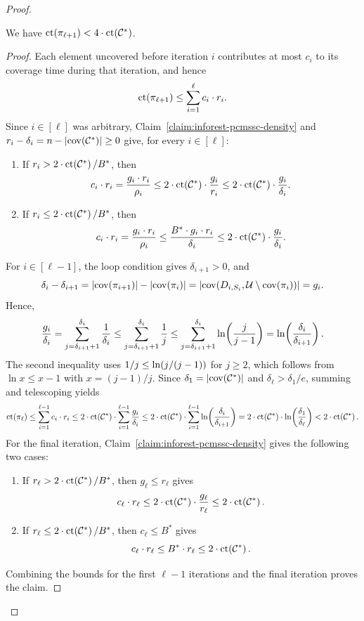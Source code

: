 \begin{proof}
\begin{claim}\label{claim:inforest-pcmssc-cost}
We have $\operatorname{ct}\mathopen{}\left( \pi_{\ell+1} \right)<4\cdot\operatorname{ct}\mathopen{}\left( \mathcal{C}^{*} \right)$.
\end{claim}
\begin{proof}
Each element uncovered before iteration $i$ contributes at most $c_i$ to its coverage time during that iteration, and hence
\[
    \operatorname{ct}\mathopen{}\left( \pi_{\ell+1} \right)\leq\sum_{i=1}^{\ell} c_i\cdot r_i.
\]
Since $i\in[\ell]$ was arbitrary, Claim~\ref{claim:inforest-pcmssc-density} and $r_i-\delta_i=n-\mathopen{}\left| \operatorname{cov}\mathopen{}\left( \mathcal{C}^{*} \right) \right|\geq0$ give, for every $i\in[\ell]$:
\begin{enumerate}
    \item If $r_i>2\cdot\operatorname{ct}\mathopen{}\left( \mathcal{C}^{*} \right)/B^*$, then
    \[
        c_i\cdot r_i=\frac{g_i\cdot r_i}{\rho_i}\leq2\cdot\operatorname{ct}\mathopen{}\left( \mathcal{C}^{*} \right)\cdot\frac{g_i}{r_i}\leq2\cdot\operatorname{ct}\mathopen{}\left( \mathcal{C}^{*} \right)\cdot\frac{g_i}{\delta_i}.
    \]
    \item If $r_i\leq2\cdot\operatorname{ct}\mathopen{}\left( \mathcal{C}^{*} \right)/B^*$, then
    \[
        c_i\cdot r_i=\frac{g_i\cdot r_i}{\rho_i}\leq\frac{B^*\cdot g_i\cdot r_i}{\delta_i}\leq2\cdot\operatorname{ct}\mathopen{}\left( \mathcal{C}^{*} \right)\cdot\frac{g_i}{\delta_i}.
    \]
\end{enumerate}
For $i\in[\ell-1]$, the loop condition gives $\delta_{i+1}>0$, and
\[
    \delta_i-\delta_{i+1}=\mathopen{}\left| \operatorname{cov}\mathopen{}\left( \pi_{i+1} \right) \right|-\mathopen{}\left| \operatorname{cov}\mathopen{}\left( \pi_i \right) \right|
    =\mathopen{}\left| \operatorname{cov}\mathopen{}\left( D_{i,S_i},\mathcal{U}\setminus\operatorname{cov}\mathopen{}\left( \pi_i \right) \right) \right|=g_i.
\]
Hence,
\[
    \frac{g_i}{\delta_i}=\sum_{j=\delta_{i+1}+1}^{\delta_i}\frac{1}{\delta_i}
    \leq\sum_{j=\delta_{i+1}+1}^{\delta_i}\frac{1}{j}
    \leq\sum_{j=\delta_{i+1}+1}^{\delta_i}\ln\mathopen{}\left( \frac{j}{j-1} \right)
    =\ln\mathopen{}\left( \frac{\delta_i}{\delta_{i+1}} \right).
\]
The second inequality uses $1/j\leq\ln\mathopen{}\left( j/(j-1) \right)$ for $j\geq2$, which follows from $\ln x\leq x-1$ with $x=(j-1)/j$.
Since $\delta_1=\mathopen{}\left| \operatorname{cov}\mathopen{}\left( \mathcal{C}^{*} \right) \right|$ and $\delta_{\ell}>\delta_1/e$, summing and telescoping yields
\[
    \operatorname{ct}\mathopen{}\left( \pi_{\ell} \right)\leq\sum_{i=1}^{\ell-1}c_i\cdot r_i\leq2\cdot\operatorname{ct}\mathopen{}\left( \mathcal{C}^{*} \right)\cdot\sum_{i=1}^{\ell-1}\frac{g_i}{\delta_i}
    \leq2\cdot\operatorname{ct}\mathopen{}\left( \mathcal{C}^{*} \right)\cdot\sum_{i=1}^{\ell-1}\ln\mathopen{}\left( \frac{\delta_i}{\delta_{i+1}} \right)
    =2\cdot\operatorname{ct}\mathopen{}\left( \mathcal{C}^{*} \right)\cdot\ln\mathopen{}\left( \frac{\delta_1}{\delta_{\ell}} \right)<2\cdot\operatorname{ct}\mathopen{}\left( \mathcal{C}^{*} \right).
\]
For the final iteration, Claim~\ref{claim:inforest-pcmssc-density} gives the following two cases:
\begin{enumerate}
    \item If $r_{\ell}>2\cdot\operatorname{ct}\mathopen{}\left( \mathcal{C}^{*} \right)/B^*$, then $g_{\ell}\leq r_{\ell}$ gives
    \[
        c_{\ell}\cdot r_{\ell}\leq2\cdot\operatorname{ct}\mathopen{}\left( \mathcal{C}^{*} \right)\cdot\frac{g_{\ell}}{r_{\ell}}\leq2\cdot\operatorname{ct}\mathopen{}\left( \mathcal{C}^{*} \right).
    \]
    \item If $r_{\ell}\leq2\cdot\operatorname{ct}\mathopen{}\left( \mathcal{C}^{*} \right)/B^*$, then $c_{\ell}\leq B^*$ gives
    \[
        c_{\ell}\cdot r_{\ell}\leq B^*\cdot r_{\ell}\leq2\cdot\operatorname{ct}\mathopen{}\left( \mathcal{C}^{*} \right).
    \]
\end{enumerate}
Combining the bounds for the first $\ell-1$ iterations and the final iteration proves the claim.
\end{proof}


\end{proof}
